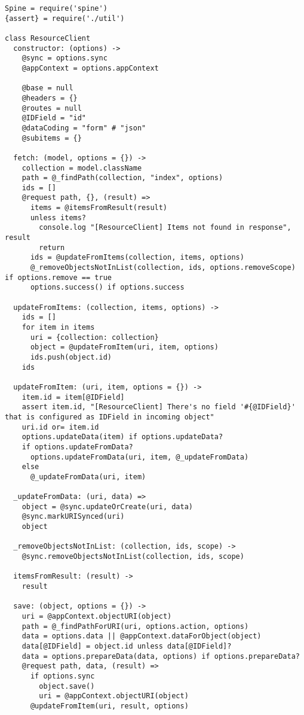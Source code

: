 \begin{lstlisting}[caption=resource\_client.coffee]
Spine = require('spine')
{assert} = require('./util')

class ResourceClient
  constructor: (options) ->
    @sync = options.sync
    @appContext = options.appContext
    
    @base = null
    @headers = {}
    @routes = null
    @IDField = "id"
    @dataCoding = "form" # "json"
    @subitems = {}

  fetch: (model, options = {}) ->
    collection = model.className
    path = @_findPath(collection, "index", options)
    ids = []
    @request path, {}, (result) =>
      items = @itemsFromResult(result)
      unless items?
        console.log "[ResourceClient] Items not found in response", result
        return
      ids = @updateFromItems(collection, items, options)
      @_removeObjectsNotInList(collection, ids, options.removeScope) if options.remove == true
      options.success() if options.success
  
  updateFromItems: (collection, items, options) ->
    ids = []
    for item in items
      uri = {collection: collection}
      object = @updateFromItem(uri, item, options)
      ids.push(object.id)
    ids
  
  updateFromItem: (uri, item, options = {}) ->
    item.id = item[@IDField]
    assert item.id, "[ResourceClient] There's no field '#{@IDField}' that is configured as IDField in incoming object"
    uri.id or= item.id
    options.updateData(item) if options.updateData?
    if options.updateFromData?
      options.updateFromData(uri, item, @_updateFromData)
    else
      @_updateFromData(uri, item)
  
  _updateFromData: (uri, data) =>
    object = @sync.updateOrCreate(uri, data)
    @sync.markURISynced(uri)
    object
  
  _removeObjectsNotInList: (collection, ids, scope) ->
    @sync.removeObjectsNotInList(collection, ids, scope)
  
  itemsFromResult: (result) ->
    result

  save: (object, options = {}) ->
    uri = @appContext.objectURI(object)
    path = @_findPathForURI(uri, options.action, options)
    data = options.data || @appContext.dataForObject(object)
    data[@IDField] = object.id unless data[@IDField]?
    data = options.prepareData(data, options) if options.prepareData?
    @request path, data, (result) =>
      if options.sync
        object.save()
        uri = @appContext.objectURI(object)
      @updateFromItem(uri, result, options)


\end{lstlisting}
